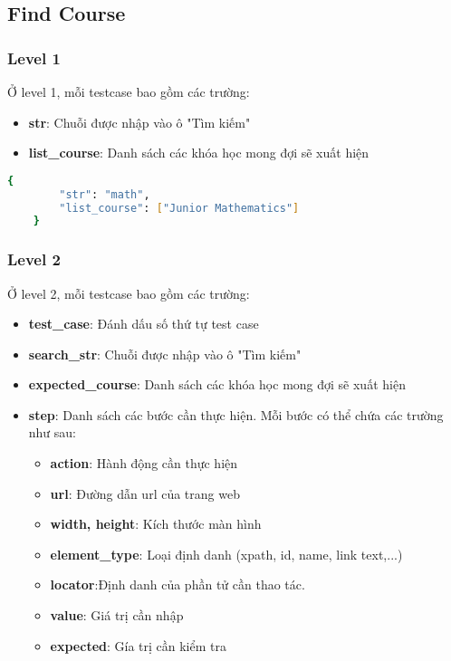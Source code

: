 \subsection{Find Course}
\subsubsection{Level 1}
Ở level 1, mỗi testcase bao gồm các trường:
\begin{itemize}
    \item \textbf{str}: Chuỗi được nhập vào ô "Tìm kiếm"
    \item \textbf{list\_course}: Danh sách các khóa học mong đợi sẽ xuất hiện
\end{itemize}

\begin{lstlisting}[language=bash, caption={Ví dụ testcase FC-001-0003 ở level 1}]
    {
        "str": "math",
        "list_course": ["Junior Mathematics"]
    }
\end{lstlisting}
\subsubsection{Level 2}
Ở level 2, mỗi testcase bao gồm các trường:
\begin{itemize}
    \item \textbf{test\_case}: Đánh dấu số thứ tự test case
    \item \textbf{search\_str}: Chuỗi được nhập vào ô "Tìm kiếm"
    \item \textbf{expected\_course}: Danh sách các khóa học mong đợi sẽ xuất hiện
    \item \textbf{step}: Danh sách các bước cần thực hiện. Mỗi bước có thể chứa các trường như sau:
    \begin{itemize}
        \item \textbf{action}: Hành động cần thực hiện
        \item \textbf{url}: Đường dẫn url của trang web
        \item \textbf{width, height}: Kích thước màn hình
        \item \textbf{element\_type}: Loại định danh (xpath, id, name, link text,...)
        \item \textbf{locator}:Định danh của phần tử cần thao tác.
        \item \textbf{value}: Giá trị cần nhập
        \item \textbf{expected}: Gía trị cần kiểm tra
    \end{itemize}
\end{itemize}

